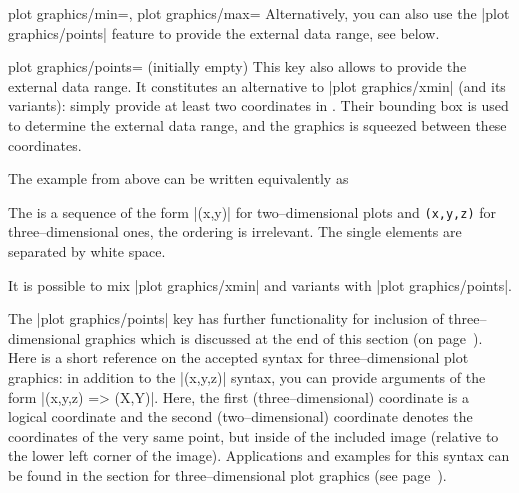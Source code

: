 {{\begin{pgfplotsxykeylist}{
	plot graphics/\x min=,
	plot graphics/\x max=}
	Alternatively, you can also use the |plot graphics/points| feature to provide the external data range, see below.
\end{pgfplotsxykeylist}

\begin{pgfplotskey}{plot graphics/points= (initially empty)}
	This key also allows to provide the external data range. It constitutes an alternative to |plot graphics/xmin| (and its variants): simply provide at least two coordinates in . Their bounding box is used to determine the external data range, and the graphics is squeezed between these coordinates. 

	The example from above can be written equivalently as
\begin{codeexample}[]
\end{codeexample}
	\noindent The  is a sequence of the form |(x,y)| for two--dimensional plots and \texttt{(x,y,z)} for three--dimensional ones, the ordering is irrelevant. The single elements are separated by white space.
	
	It is possible to mix |plot graphics/xmin| and variants with |plot graphics/points|.

	The |plot graphics/points| key has further functionality for inclusion of three--dimensional graphics which is discussed at the end of this section (on page~\pageref{sec:plotgraphics3d}). Here is a short reference on the accepted syntax for three--dimensional plot graphics: in addition to the |(x,y,z)| syntax, you can provide arguments of the form |(x,y,z) => (X,Y)|. Here, the first (three--dimensional) coordinate is a logical coordinate and the second (two--dimensional) coordinate denotes the coordinates of the very same point, but inside of the included image (relative to the lower left corner of the image). Applications and examples for this syntax can be found in the section for three--dimensional plot graphics (see page~\pageref{sec:plotgraphics3d}).
\end{pgfplotskey}

}}

